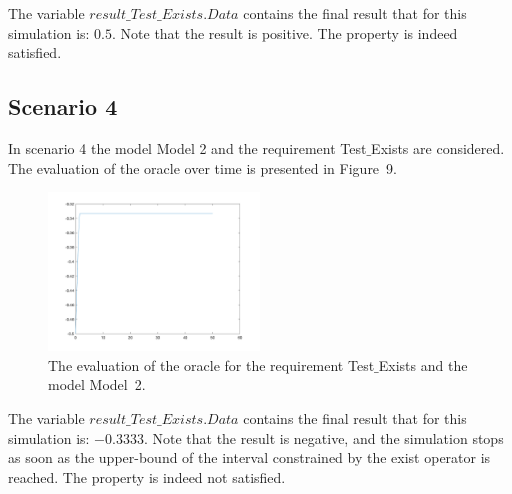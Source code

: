 \documentclass[12pt]{extarticle}
\newcommand{\<}{\langle}
\renewcommand{\>}{\rangle}
\theoremstyle{definition}
\begin{document}
The variable  $result\_Test\_Exists.Data$  contains the final result that for this simulation is: $0.5$.
Note that the result is positive. 
The property is indeed satisfied.




\subsection{Scenario 4}
In scenario 4 the model Model 2 and the requirement Test$\_$Exists are considered. 
The evaluation of the oracle over time is presented in Figure~9.

\begin{figure}[h]
\caption{The evaluation of the oracle for the requirement Test$\_$Exists  and the model Model~2.}
  \centering
    \includegraphics[width=0.5\textwidth]{Manual/resModel2TestExists.png}
\end{figure}


The variable  $result\_Test\_Exists.Data$  contains the final result that for this simulation is: $-0.3333$.
Note that the result is negative, and the simulation stops as soon as the upper-bound of the interval constrained by the exist operator is reached.
The property is indeed not satisfied.
\end{document}
